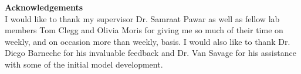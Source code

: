 
\mbox{}\newline\vspace{10mm} \mbox{}\LARGE
%
{\bf Acknowledgements} \normalsize \vspace{5mm}\\
I would like to thank my supervisor Dr. Samraat Pawar as well as fellow lab members Tom Clegg and Olivia Moris for giving me so much of their time on weekly, and on occasion more than weekly, basis.  I would also like to thank Dr. Diego Barneche for his invaluable feedback and Dr. Van Savage for his assistance with some of the initial model development.





